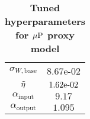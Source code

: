 \begin{table}
    \centering
    \caption{\textbf{Tuned hyperparameters for $\mbox{$\mu$P}$ proxy model}\label{tab:mup_hps}}
    \begin{tabular}{cc}
         \toprule
         $\sigma_{W,\text{base}}$& $8.67$e-$02$ \\
         $\tilde{\eta}$& $1.62\mbox{e-}02$\\
         $\alpha_{\text{input}}$& $9.17$\\
         $\alpha_{\text{output}}$& $1.095$\\
         \bottomrule
    \end{tabular}
\end{table}
